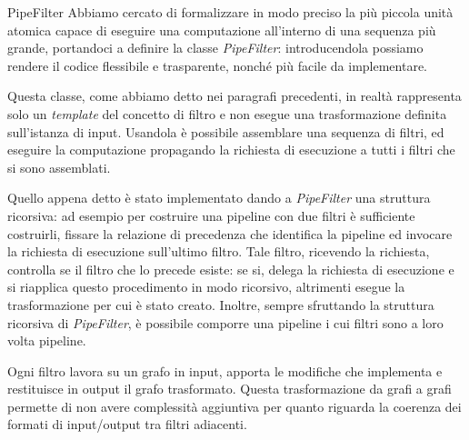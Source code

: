 \begin{paragraph}{PipeFilter}
  Abbiamo cercato di formalizzare in modo preciso la pi\`u piccola
  unit\`a atomica capace di eseguire una computazione all'interno di
  una sequenza pi\`u grande, portandoci a definire la classe
  \emph{PipeFilter}: introducendola possiamo rendere il codice
  flessibile e trasparente, nonch\'e pi\`u facile da implementare.

  Questa classe, come abbiamo detto nei paragrafi precedenti, in
  realt\`a rappresenta solo un \emph{template} del concetto di filtro
  e non esegue una trasformazione definita sull'istanza di
  input. Usandola \`e possibile assemblare una sequenza di filtri, ed
  eseguire la computazione propagando la richiesta di esecuzione a
  tutti i filtri che si sono assemblati.

  Quello appena detto \`e stato implementato dando a \emph{PipeFilter}
  una struttura ricorsiva: ad esempio per costruire una pipeline con
  due filtri \`e sufficiente costruirli, fissare la relazione di
  precedenza che identifica la pipeline ed invocare la richiesta di
  esecuzione sull'ultimo filtro. Tale filtro, ricevendo la richiesta,
  controlla se il filtro che lo precede esiste: se si, delega la
  richiesta di esecuzione e si riapplica questo procedimento in modo
  ricorsivo, altrimenti esegue la trasformazione per cui \`e stato
  creato. Inoltre, sempre sfruttando la struttura ricorsiva di
  \emph{PipeFilter}, \`e possibile comporre una pipeline i cui filtri
  sono a loro volta pipeline.

  Ogni filtro lavora su un grafo in input, apporta le modifiche che
  implementa e restituisce in output il grafo trasformato. Questa
  trasformazione da grafi a grafi permette di non avere complessit\`a
  aggiuntiva per quanto riguarda la coerenza dei formati di
  input/output tra filtri adiacenti.
\end{paragraph}

